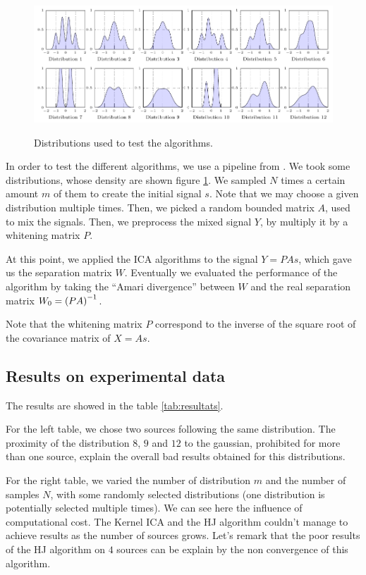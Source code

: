 \documentclass[a4paper]{article}
\begin{document}
\begin{figure}
\centering
\includegraphics[scale=0.9]{figure_tikz/graph_distrib.pdf}\\
\caption{Distributions used to test the algorithms.\label{fig:distrib}}
\end{figure}

In order to test the different algorithms, we use a pipeline from \cite{bach2003kernel}.
We took some distributions, whose density are shown figure \ref{fig:distrib}.
We sampled $N$ times a certain amount $m$ of them to create the initial signal $s$. Note that we may choose a given distribution multiple times.
Then, we picked a random bounded matrix $A$, used to mix the signals.
Then, we preprocess the mixed signal $Y$, by multiply it by a whitening matrix $P$.

At this point, we applied the ICA algorithms to the signal $Y = PAs$, which gave us the separation matrix $W$.
Eventually we evaluated the performance of the algorithm by taking the ``Amari divergence'' between $W$ and the real separation matrix $W_0 = \zp{PA}^{-1}$.

Note that the whitening matrix $P$ correspond to the inverse of the square root of the covariance matrix of $X=As$.

\subsection{Results on experimental data}

The results are showed in the table \ref{tab:resultats}.

For the left table, we chose two sources following the same distribution.
The proximity of the distribution $8$, $9$ and $12$ to the gaussian, prohibited
for more than one source, explain the overall bad results obtained for this
distributions.

For the right table, we varied the number of distribution $m$ and the number of
samples $N$, with some randomly selected distributions (one distribution is
potentially selected multiple times). We can see here the influence of
computational cost. The Kernel ICA and the HJ algorithm couldn't manage to
achieve results as the number of sources grows. Let's remark that the poor results of the HJ algorithm on $4$ sources can be explain by the non convergence of this algorithm.
\end{document}
